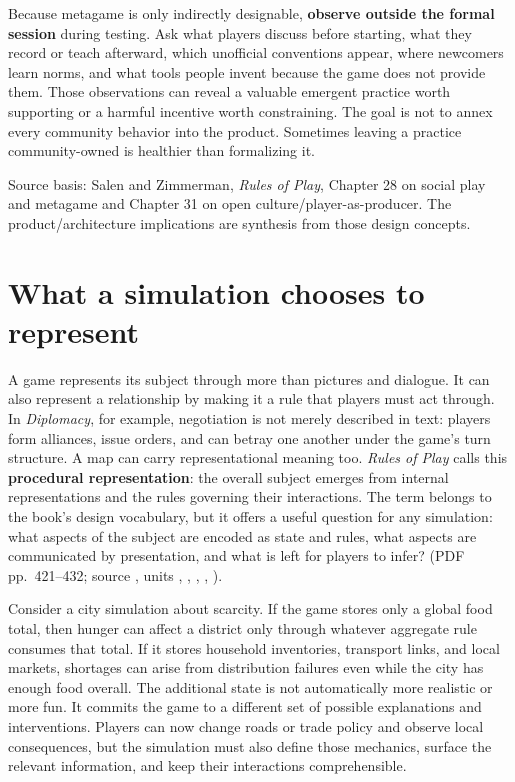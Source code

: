 Because metagame is only indirectly designable, \textbf{observe outside the formal session} during testing. Ask what players discuss before starting, what they record or teach afterward, which unofficial conventions appear, where newcomers learn norms, and what tools people invent because the game does not provide them. Those observations can reveal a valuable emergent practice worth supporting or a harmful incentive worth constraining. The goal is not to annex every community behavior into the product. Sometimes leaving a practice community-owned is healthier than formalizing it.

Source basis: Salen and Zimmerman, \emph{Rules of Play}, Chapter 28 on social play and metagame and Chapter 31 on open culture/player-as-producer. The product/architecture implications are synthesis from those design concepts.

\section{What a simulation chooses to represent}\label{06-engine-ii-ch046-what-a-simulation-chooses-to-represent}

\hypertarget{06-engine-ii-ch046-what-a-simulation-chooses-to-represent}{}

A game represents its subject through more than pictures and dialogue. It can also represent a relationship by making it a rule that players must act through. In \emph{Diplomacy}, for example, negotiation is not merely described in text: players form alliances, issue orders, and can betray one another under the game's turn structure. A map can carry representational meaning too. \emph{Rules of Play} calls this \textbf{procedural representation}: the overall subject emerges from internal representations and the rules governing their interactions. The term belongs to the book's design vocabulary, but it offers a useful question for any simulation: what aspects of the subject are encoded as state and rules, what aspects are communicated by presentation, and what is left for players to infer? (PDF pp.~421--432; source , units , , , , ).

Consider a city simulation about scarcity. If the game stores only a global food total, then hunger can affect a district only through whatever aggregate rule consumes that total. If it stores household inventories, transport links, and local markets, shortages can arise from distribution failures even while the city has enough food overall. The additional state is not automatically more realistic or more fun. It commits the game to a different set of possible explanations and interventions. Players can now change roads or trade policy and observe local consequences, but the simulation must also define those mechanics, surface the relevant information, and keep their interactions comprehensible.

